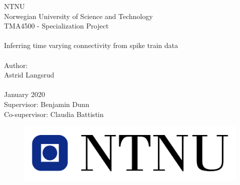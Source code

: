 \documentclass[pdftex,10pt,b5paper,twoside]{book}
\begin{document}
\graphicspath{{fig/}}


\thispagestyle{empty}

\begin{center}

\Large{NTNU}\\
\normalsize{Norwegian University of Science and Technology}\\
[3pc]
\Large{TMA4500 - Specialization Project}\\

\Huge{\hrulefill\\Inferring time varying connectivity from spike train data \\\hrulefill}\\[2pc]
\small{Author:}\\\Large{Astrid Langsrud}\\
\mbox{}\\[3pc]
\large{January 2020}\\[2pc]

\small{Supervisor: Benjamin Dunn}\\
\small{Co-supervisor: Claudia Battistin}

\end{center}
\vfill

\begin{figure}[h]
\centering
\includegraphics[scale=0.5]{fig/ntnu-logo.jpg}
\label{fig:frontpage_logo}
\end{figure}











\end{document}
